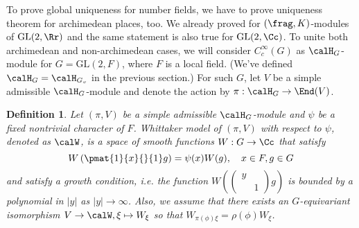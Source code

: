 \documentclass{article}
\newtheorem{theorem}{Theorem}[section]
\newtheorem{definition}{Definition}[section]
\newcommand{\GL}{\mathrm{GL}}
\newcommand{\smat}[4]{\left(\begin{smallmatrix} #1 & #2 \\ #3 & #4 \end{smallmatrix}\right)}
\begin{document}
\begin{comment}
We can think Whittaker models as functions on $\GL(2, F)$ that satisfy the similar equation. 
\begin{definition}
Let $F$ be a non-archimedean local field, $\psi$ a nontrivial additive character of $F$, and let $(\pi, V)$ be an irreducible admissible representation of $\GL(2, F)$. 
A space of functions $W:\GL(2, F) \to \Cc$ satisfying 
$$
W\left( \pmat{1}{x}{}{1} g\right) = \psi(x) W(g), \quad x\in F, g\in\GL(2, F)
$$
is called a Whittaker model for $(\pi, V)$, and denoted as $\calW_{\pi}$. 
\end{definition}

There's no big difference between Whittaker functionals and Whittaker models. 

\begin{theorem}[Local multiplicity one, Whittaker model version]
The space of Whittaker functional is isomorphic to the space of Whittaker models. In particular, $\dim \calW_{\pi} \leq 1$. 
\end{theorem}
\begin{proof}
For a given nonzero $\Lambda$, define $W_{\xi}: \GL(2, F) \to \Cc$ as 
$
W_{\xi}(g) = \Lambda(\pi(g)\xi)
$
for $\xi\in V$. Then $W_{\pi(g)\xi} = \rho(g)W_{\xi}$ (where $\rho$ is the action of $\GL(2, F)$ by right translation), so the space $\calW = \{W_{\xi}\,:\, \xi\in V\}$ is closed under right translation and isomorphic to $\pi$. 
Conversely, if $\calW$ is given with an isomorphism $\xi \mapsto W_{\xi}$ between $\pi$ and $\calW$, then $\Lambda:\xi \mapsto W_{\xi}(1)$ define a nonzero Whittaker functional. 
The last statement follows from the local multiplicity one theorem (Theorem \ref{nonarchmultone}). 
\end{proof}
\end{comment}

To prove global uniqueness for number fields, we have to prove uniqueness theorem for archimedean places, too. We already proved for $(\frag, K)$-modules of $\GL(2, \Rr)$ and the same statement is also  true for $\GL(2, \Cc)$. 
To unite both archimedean and non-archimedean cases, we will consider $C_{c}^{\infty}(G)$ as $\calH_{G}$-module for $G = \GL(2, F)$, where $F$ is a local field. (We've defined $\calH_G = \calH_{G_{v}}$ in the previous section.)
For such $G$, let $V$ be a simple admissible $\calH_{G}$-module and denote the action by $\pi:\calH_{G}\to \End(V)$. 

\begin{definition}
Let $(\pi, V)$ be a simple admissible $\calH_{G}$-module and $\psi$ be a fixed nontrivial character of $F$. 
Whittaker model of $(\pi, V)$ with respect to $\psi$, denoted as $\calW$, is a space of smooth functions $W: G\to \Cc$ that satisfy
$$
W\left(\pmat{1}{x}{}{1}g\right) = \psi(x)W(g), \quad x\in F, g\in G
$$
and satisfy a growth condition, i.e. the function $W(\smat{y}{}{}{1}g)$ is bounded by a polynomial in $|y|$ as $|y| \to \infty$. Also, we assume that there exists an $G$-equivariant  isomorphism $V\to \calW, \xi\mapsto W_{\xi}$ so that $W_{\pi(\phi)\xi} = \rho(\phi)W_{\xi}$. 
\end{definition}
\end{document}
